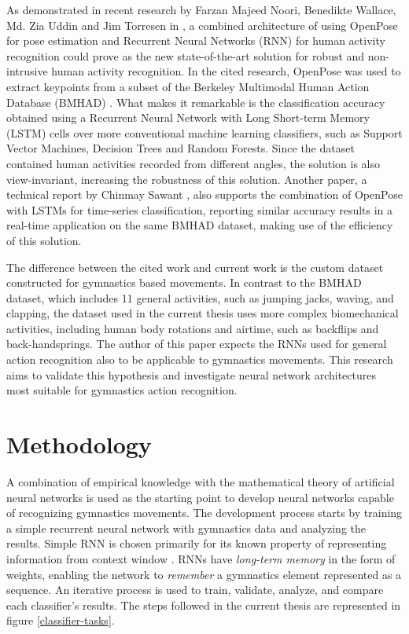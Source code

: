 As demonstrated in recent research by Farzan Majeed Noori,
Benedikte Wallace, Md. Zia Uddin and Jim Torresen in \cite{10.1007/978-3-030-20205-7_25}, a combined architecture of using OpenPose for pose estimation and Recurrent Neural Networks (RNN) for human activity recognition could prove as the new state-of-the-art solution for robust and non-intrusive human activity recognition. In the cited research, OpenPose was used to extract keypoints from a subset of the Berkeley Multimodal Human Action Database (BMHAD) \cite{Berkeley-MHAD}. What makes it remarkable is the classification accuracy obtained using a Recurrent Neural Network with Long Short-term Memory (LSTM) cells over more conventional machine learning classifiers, such as Support Vector Machines, Decision Trees and Random Forests. Since the dataset contained human activities recorded from different angles, the solution is also view-invariant, increasing the robustness of this solution. Another paper, a technical report by Chinmay Sawant \cite{sawant2020human}, also supports the combination of OpenPose with LSTMs for time-series classification, reporting similar accuracy results in a real-time application on the same BMHAD dataset, making use of the efficiency of this solution.

The difference between the cited work and current work is the custom dataset constructed for gymnastics based movements. In contrast to the BMHAD dataset, which includes 11 general activities, such as jumping jacks, waving, and clapping, the dataset used in the current thesis uses more complex biomechanical activities, including human body rotations and airtime, such as backflips and back-handsprings. The author of this paper expects the RNNs used for general action recognition also to be applicable to gymnastics movements. This research aims to validate this hypothesis and investigate neural network architectures most suitable for gymnastics action recognition. 

\section{Methodology}

A combination of empirical knowledge with the mathematical theory of artificial neural networks is used as the starting point to develop neural networks capable of recognizing gymnastics movements. The development process starts by training a simple recurrent neural network with gymnastics data and analyzing the results. Simple RNN is chosen primarily for its known property of representing information from context window \cite{DBLP:journals/corr/Lipton15}. RNNs have \textit{long-term memory} in the form of weights, enabling the network to \textit{remember} a gymnastics element represented as a sequence. An iterative process is used to train, validate, analyze, and compare each classifier's results. The steps followed in the current thesis are represented in figure \ref{classifier-tasks}.

